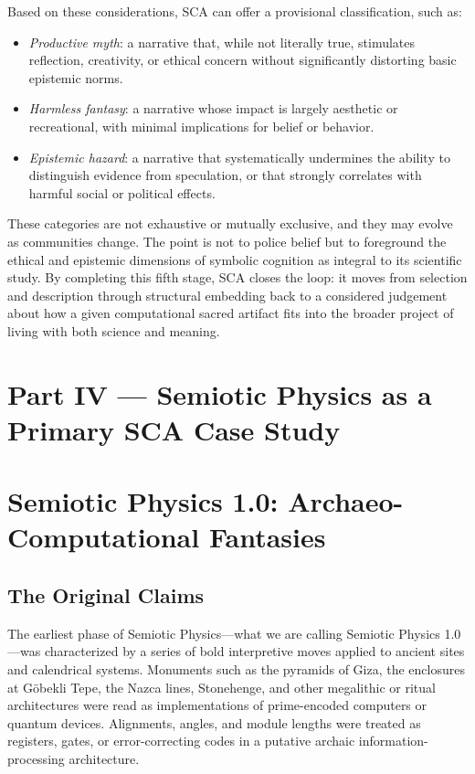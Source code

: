 \documentclass[12]{amsart}
\theoremstyle{plain}
\begin{document}
Based on these considerations, SCA can offer a provisional classification, such as:

\begin{itemize}
  \item \emph{Productive myth}: a narrative that, while not literally true, stimulates reflection, creativity, or ethical concern without significantly distorting basic epistemic norms.
  \item \emph{Harmless fantasy}: a narrative whose impact is largely aesthetic or recreational, with minimal implications for belief or behavior.
  \item \emph{Epistemic hazard}: a narrative that systematically undermines the ability to distinguish evidence from speculation, or that strongly correlates with harmful social or political effects.
\end{itemize}

These categories are not exhaustive or mutually exclusive, and they may evolve as communities change. The point is not to police belief but to foreground the ethical and epistemic dimensions of symbolic cognition as integral to its scientific study. By completing this fifth stage, SCA closes the loop: it moves from selection and description through structural embedding back to a considered judgement about how a given computational sacred artifact fits into the broader project of living with both science and meaning.


\section*{Part IV — Semiotic Physics as a Primary SCA Case Study}

\section{Semiotic Physics 1.0: Archaeo-Computational Fantasies}

\subsection{The Original Claims}

The earliest phase of Semiotic Physics---what we are calling Semiotic Physics 1.0---was characterized by a series of bold interpretive moves applied to ancient sites and calendrical systems. Monuments such as the pyramids of Giza, the enclosures at Göbekli Tepe, the Nazca lines, Stonehenge, and other megalithic or ritual architectures were read as implementations of prime-encoded computers or quantum devices. Alignments, angles, and module lengths were treated as registers, gates, or error-correcting codes in a putative archaic information-processing architecture.
\end{document}

